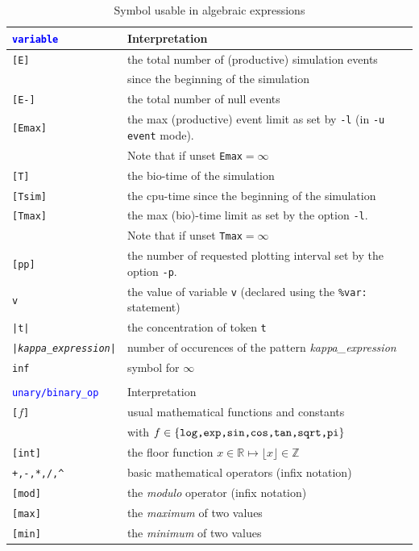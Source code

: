 \documentclass[11pt]{book}
\def\tcb#1{\textcolor{blue}{\ttt{#1}}}
\def\ttt#1{\texttt{#1}}
\def\var#1{{\textquotesingle}#1{\textquotesingle}}
\def\set#1{\{#1\}}
\def\Real{\mathbb R}
\def\Z{\mathbb Z}
\begin{document}
\begin{table}[htbp]
\centering
\caption{Symbol usable in algebraic expressions%
}
\begin{tabular}{@{} l|l @{} }
\toprule
\ttt{\tcb{variable}} & Interpretation \\
\midrule
\ttt{[E]} & the total number of (productive) simulation events\index{event}\\
& since the beginning of the simulation \\
\ttt{[E-]} & the total number of null events\index{null event}\\
\ttt{[Emax]} & the max (productive) event limit as set by \ttt{-l} (in \ttt{-u event} mode). \\ &Note that if unset \ttt{Emax}$=\infty$\\
\ttt{[T]} & the bio-time of the simulation \\
\ttt{[Tsim]} & the cpu-time since the beginning of the simulation \\
\ttt{[Tmax]} & the max (bio)-time limit as set by the option \ttt{-l}. \\ &Note that if unset \ttt{Tmax}$=\infty$\\
\ttt{[pp]} & the number of requested plotting interval set by the option \ttt{-p}. \\

\ttt{\var{v}} & the value of variable \ttt{\var{v}} (declared using the \ttt{\%var:} statement) \\
\ttt{|t|} & the concentration of token \ttt{t}\\
\ttt{|\textit{kappa\_expression}|} & number of occurences of the pattern \textit{kappa\_expression}\\
\ttt{inf} & symbol for $\infty$ \\\\
\toprule
\ttt{\tcb{unary/binary\_op}} & Interpretation \\
\midrule
\ttt{[}$f$\texttt{]} & usual mathematical functions and constants \\ &with $f\in\set{\hbox{\ttt{log,exp,sin,cos,tan,sqrt,pi}}}$ \\
\ttt{[int]} & the floor function $x\in\Real\mapsto \lfloor x\rfloor\in\Z$ \\
\ttt{+,-,*,/,\textasciicircum} & basic mathematical operators (infix notation)\\
\ttt{[mod]} & the \emph{modulo} operator (infix notation)\\
\ttt{[max]} & the \emph{maximum} of two values \\
\ttt{[min]} & the \emph{minimum} of two values \\
\bottomrule
\end{tabular}
\label{tab:operators}
\end{table}
\end{document}
